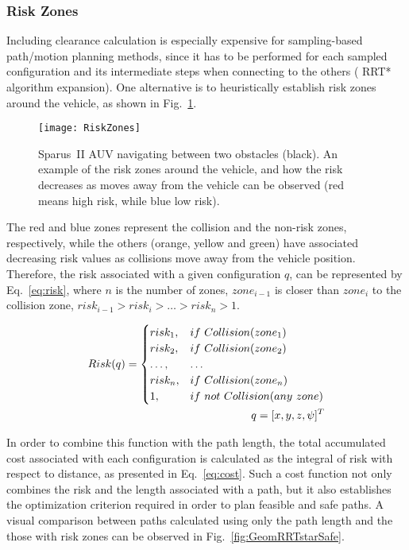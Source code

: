 \subsubsection{Risk Zones}

Including clearance calculation is especially expensive for sampling-based
path/motion planning methods, since it has to be performed for each sampled
configuration and its intermediate steps when connecting to the others (\eg
\ac{RRT*} algorithm expansion). One alternative is to heuristically establish
risk zones around the vehicle, as shown in Fig.~\ref{fig:RiskZones}.

\begin{figure}[htbp]
	\centering
	\texttt{[image: RiskZones]}
\caption[Sparus~II AUV navigating between two obstacles and a visual
representation of the risk zones around the vehicle.]
{Sparus~II \ac{AUV} navigating between two obstacles (black). An example of the
risk zones around the vehicle, and how the risk decreases as moves away from the
vehicle can be observed (red means high risk, while blue low risk).}
\label{fig:RiskZones}
\end{figure}

The red and blue zones represent the collision and the non-risk zones,
respectively, while the others (orange, yellow and green) have associated
decreasing risk values as collisions move away from the vehicle position.
Therefore, the risk associated with a given configuration $q$, can be
represented by Eq.~\eqref{eq:risk}, where $n$ is the number of zones,
$zone_{i-1}$ is closer than $zone_{i}$ to the collision zone,
$risk_{i-1}>risk_{i}>\ldots>risk_{n}>1$.

\begin{align} 
	\label{eq:risk}
	Risk(q)=
	\begin{cases}
		risk_1, & if\ Collision(zone_1)\\
		risk_2, & if\ Collision(zone_2)\\
		\ldots, & \ldots\\
		risk_n, & if\ Collision(zone_n)\\
		1, & if\ not\ Collision(any\ zone)\\
	\end{cases}
	\notag\\
	q=[x,y,z,\psi]^T
\end{align}

In order to combine this function with the path length, the total accumulated
cost associated with each configuration is calculated as the integral of risk
with respect to distance, as presented in Eq.~\eqref{eq:cost}. Such a cost
function not only combines the risk and the length associated with a path, but
it also establishes the optimization criterion required in order to plan feasible
and safe paths. A visual comparison between paths calculated using only the path
length and the those with risk zones can be observed in
Fig.~\ref{fig:GeomRRTstarSafe}.


